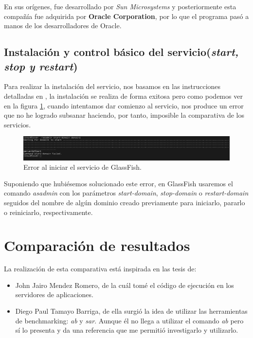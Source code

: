\documentclass[a4paper, 10pt]{article}
\begin{document}
	En sus orígenes, fue desarrollado por \textit{Sun Microsystems} y posteriormente esta compañía
	fue adquirida por \textbf{Oracle Corporation}, por lo que el programa pasó a manos de los
	desarrolladores de Oracle.

	\subsection{Instalación y control básico del servicio(\textit{start, stop y restart})}
		Para realizar la instalación del servicio, nos basamos en las instrucciones detalladas
		en \cite{GF_install}, la instalación se realiza de forma exitosa pero como podemos ver
		en la figura \ref{fig:GF_Fail}, cuando intentamos dar comienzo al servicio, nos produce
		un error que no he logrado subsanar haciendo, por tanto, imposible la comparativa de los
		servicios.

		\begin{figure}[h!]
			\includegraphics[width=15cm]{Fail_GF.png}
			\caption{Error al iniciar el servicio de GlassFish.}
			\label{fig:GF_Fail}
		\end{figure}

		Suponiendo que hubiésemos solucionado este error, en GlassFish usaremos el comando
		\textit{asadmin} con los parámetros \textit{start-domain}, \textit{stop-domain} o
		\textit{restart-domain} seguidos del nombre de algún dominio creado previamente
		para iniciarlo, pararlo o reiniciarlo, respectivamente.

\section{Comparación de resultados}
	La realización de esta comparativa está inspirada en las tesis de:
		\begin{itemize}
			\item John Jairo Mendez Romero\cite{JJMR_Tesis}, de la cuál tomé el código de
			ejecución en los servidores de aplicaciones.
			
			\item Diego Paul Tamayo Barriga\cite{DPTB_Tesis}, de ella surgió la idea de utilizar
			las herramientas de benchmarking: \textit{ab} y \textit{sar}. Aunque él no llega a
			utilizar el comando \textit{ab} pero sí lo presenta y da una referencia que me
			permitió investigarlo y utilizarlo.
		\end{itemize}
\end{document}
